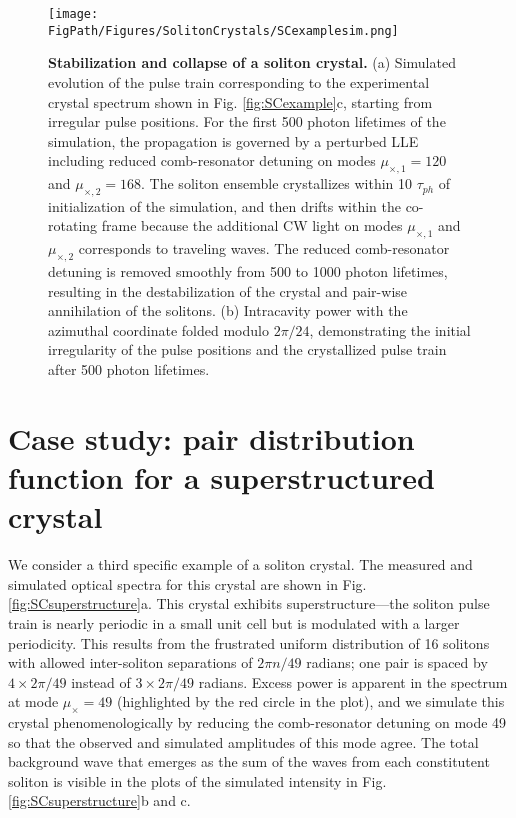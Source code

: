 
\begin{figure}[htpb]
	\begin{center}
		\texttt{[image: \\FigPath/Figures/SolitonCrystals/SCexamplesim.png]}
	\end{center}
	\caption[Stabilization and collapse of a soliton crystal]{\textbf{Stabilization and collapse of a soliton crystal.} (a) Simulated evolution of the pulse train corresponding to the experimental crystal spectrum shown in Fig. \ref{fig:SCexample}c, starting from irregular pulse positions. For the first 500 photon lifetimes of the simulation, the propagation is governed by a perturbed LLE including reduced comb-resonator detuning on modes $\mu_{\times,1}=120$ and $\mu_{\times,2}=168$. The soliton ensemble crystallizes within 10 $\tau_{ph}$ of initialization of the simulation, and then drifts within the co-rotating frame because the additional CW light on modes $\mu_{\times,1}$ and $\mu_{\times,2}$ corresponds to traveling waves. The reduced comb-resonator detuning is removed smoothly from 500 to 1000 photon lifetimes, resulting in the destabilization of the crystal and pair-wise annihilation of the solitons. (b) Intracavity power with the azimuthal coordinate folded modulo $2\pi/24$, demonstrating the initial irregularity of the pulse positions and the crystallized pulse train after 500 photon lifetimes.}
	\label{fig:SCexamplesim}
\end{figure} 


\section{Case study: pair distribution function for a superstructured crystal}

We consider a third specific example of a soliton crystal. The measured and simulated optical spectra for this crystal are shown in Fig. \ref{fig:SCsuperstructure}a. This crystal exhibits superstructure---the soliton pulse train is nearly periodic in a small unit cell but is modulated with a larger periodicity. This results from the frustrated uniform distribution of 16 solitons with allowed inter-soliton separations of $2\pi n/49$ radians; one pair is spaced by $4 \times 2\pi/49$ instead of $3 \times 2\pi/49$ radians.  Excess power is apparent in the spectrum at mode $\mu_\times=49$ (highlighted by the red circle in the plot), and we simulate this crystal phenomenologically by reducing the comb-resonator detuning on mode 49 so that the observed and simulated amplitudes of this mode agree. The total background wave that emerges as the sum of the waves from each constitutent soliton is visible in the plots of the simulated intensity in Fig. \ref{fig:SCsuperstructure}b and c.

